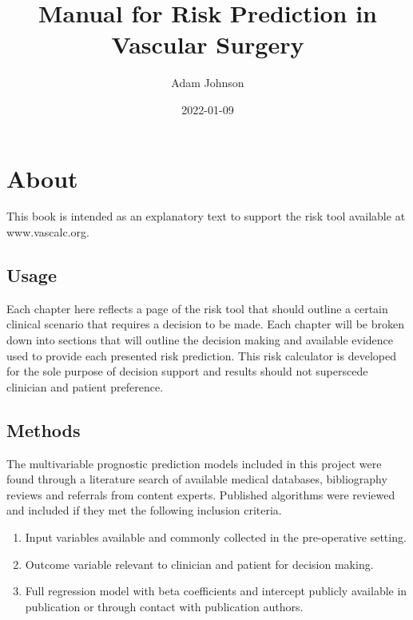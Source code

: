 \documentclass[
]{book}
\title{Manual for Risk Prediction in Vascular Surgery}
\author{Adam Johnson}
\date{2022-01-09}
\providecommand{\tightlist}{%
  \setlength{\itemsep}{0pt}\setlength{\parskip}{0pt}}
\begin{document}
\maketitle

{
\setcounter{tocdepth}{1}
\tableofcontents
}
\hypertarget{about}{%
\chapter{About}\label{about}}

This book is intended as an explanatory text to support the risk tool available at www.vascalc.org.

\hypertarget{usage}{%
\section{Usage}\label{usage}}

Each chapter here reflects a page of the risk tool that should outline a certain clinical scenario that requires a decision to be made. Each chapter will be broken down into sections that will outline the decision making and available evidence used to provide each presented risk prediction. This risk calculator is developed for the sole purpose of decision support and results should not superscede clinician and patient preference.

\hypertarget{methods}{%
\section{Methods}\label{methods}}

The multivariable prognostic prediction models included in this project were found through a literature search of available medical databases, bibliography reviews and referrals from content experts. Published algorithms were reviewed and included if they met the following inclusion criteria.

\begin{enumerate}
\def\labelenumi{\arabic{enumi}.}
\tightlist
\item
  Input variables available and commonly collected in the pre-operative setting.
\item
  Outcome variable relevant to clinician and patient for decision making.
\item
  Full regression model with beta coefficients and intercept publicly available in publication or through contact with publication authors.
\end{enumerate}
\end{document}
